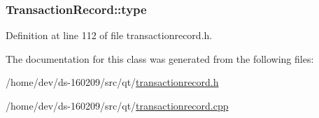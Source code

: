 \subsubsection[{type}]{ Transaction\+Record\+::type}\label{class_transaction_record_a6a68c861c3f1f10971fa11d8fc7c46e1}


Definition at line 112 of file transactionrecord.\+h.



The documentation for this class was generated from the following files\+:\begin{DoxyCompactItemize}
\item 
/home/dev/ds-\/160209/src/qt/\hyperlink{transactionrecord_8h}{transactionrecord.\+h}\item 
/home/dev/ds-\/160209/src/qt/\hyperlink{transactionrecord_8cpp}{transactionrecord.\+cpp}\end{DoxyCompactItemize}
